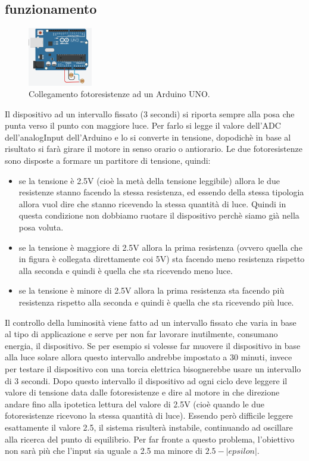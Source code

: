 \documentclass[11pt,oneside,a4paper]{article}
\begin{document}
\subsection{funzionamento}
\begin{figure}
    \centering
    \includegraphics[width=0.25\textwidth]{figures/photoresistors}
    \caption{Collegamento fotoresistenze ad un Arduino UNO.}
\end{figure}
Il dispositivo ad un intervallo fissato (3 secondi) si riporta sempre alla posa che punta verso il punto con maggiore luce. Per farlo si legge il valore dell'ADC dell'analogInput dell'Arduino e lo si converte in tensione, dopodichè in base al risultato si farà girare il motore in senso orario o antiorario. Le due fotoresistenze sono disposte a formare un partitore di tensione, quindi:
\begin{itemize}
    \item se la tensione è 2.5V (cioè la metà della tensione leggibile) allora le due resistenze stanno facendo la stessa resistenza, ed essendo della stessa tipologia allora vuol dire che stanno ricevendo la stessa quantità di luce. Quindi in questa condizione non dobbiamo ruotare il dispositivo perchè siamo già nella posa voluta.
    \item se la tensione è maggiore di 2.5V allora la prima resistenza (ovvero quella che in figura è collegata direttamente coi 5V) sta facendo meno resistenza rispetto alla seconda e quindi è quella che sta ricevendo meno luce.
    \item se la tensione è minore di 2.5V allora la prima resistenza sta facendo più resistenza rispetto alla seconda e quindi è quella che sta ricevendo più luce.
\end{itemize}
Il controllo della luminosità viene fatto ad un intervallo fissato che varia in base al tipo di applicazione e serve per non far lavorare inutilmente, consumano energia, il dispositivo. Se per esempio si volesse far muovere il dispositivo in base alla luce solare allora questo intervallo andrebbe impostato a 30 minuti, invece per testare il dispositivo con una torcia elettrica bisognerebbe usare un intervallo di 3 secondi.
Dopo questo intervallo il dispositivo ad ogni ciclo deve leggere il valore di tensione data dalle fotoresistenze e dire al motore in che direzione andare fino alla ipotetica lettura del valore di 2.5V (cioè quando le due fotoresistenze ricevono la stessa quantità di luce). Essendo però difficile leggere esattamente il valore 2.5, il sistema risulterà instabile, continuando ad oscillare alla ricerca del punto di equilibrio. Per far fronte a questo problema, l'obiettivo non sarà più che l'input sia uguale a 2.5 ma minore di $2.5 - |epsilon|$.
\end{document}
